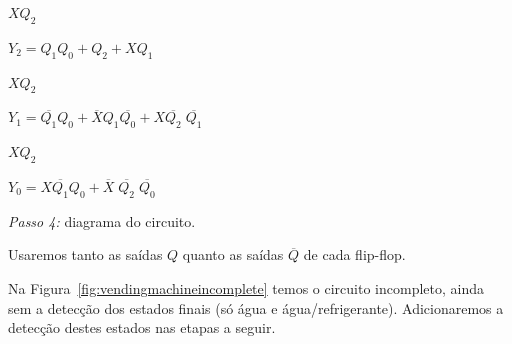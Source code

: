 \documentclass[a4paper,12pt,notitlepage]{article}
\def\Not#1{\overline{#1}}
\def\passo#1{\vspace{1ex}\noindent{}\emph{Passo #1:}}
\begin{document}
\noindent
\begin{minipage}{0.275\textwidth}
\begin{Karnaugh}{$X Q_2$}{}
\end{Karnaugh}

\vspace{-1.3\baselineskip}

$Y_2 = Q_1 Q_0 + Q_2 + X Q_1$

\end{minipage}%
\hfill
\begin{minipage}{0.33\textwidth}
\begin{Karnaugh}{$X Q_2$}{}
\end{Karnaugh}

\vspace{-1.3\baselineskip}

$Y_1 = \Not{Q_1} Q_0 + \Not{X} Q_1 \Not{Q_0} + X \Not{Q_2} \; \Not{Q_1}$

\end{minipage}%
\hfill
\begin{minipage}{0.33\textwidth}
\begin{Karnaugh}{$X Q_2$}{}
\end{Karnaugh}

\vspace{-1.3\baselineskip}

$Y_0 = X \Not{Q_1} Q_0 + \Not{X} \; \Not{Q_2} \; \Not{Q_0}$

\end{minipage}%

\vfill

\passo{4} diagrama do circuito.

Usaremos tanto as saídas $Q$ quanto as saídas $\Not{Q}$ de cada flip-flop.

Na Figura~\ref{fig:vendingmachineincomplete} temos o circuito incompleto,
ainda sem a detecção dos estados finais (só água e água/re\-fri\-ge\-ran\-te). Adicionaremos a detecção destes estados nas etapas a seguir.
\end{document}
